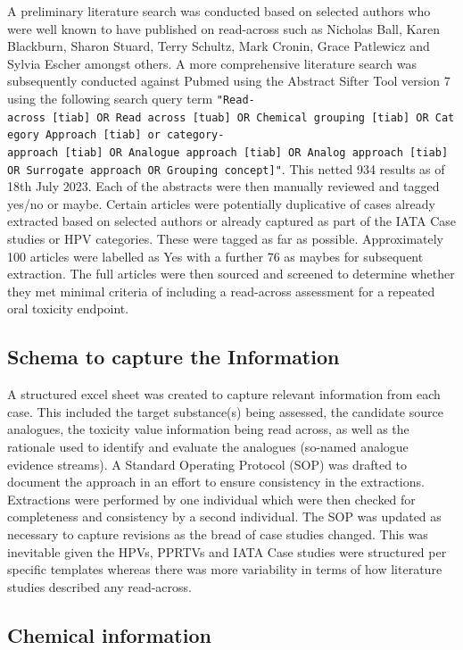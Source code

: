 \documentclass[
  super,
  preprint,
  3p]{elsarticle}
\begin{document}
A preliminary literature search was conducted based on selected authors
who were well known to have published on read-across such as Nicholas
Ball, Karen Blackburn, Sharon Stuard, Terry Schultz, Mark Cronin, Grace
Patlewicz and Sylvia Escher amongst others. A more comprehensive
literature search was subsequently conducted against Pubmed using the
Abstract Sifter Tool version 7 using the following search query term
\texttt{"Read-across\ {[}tiab{]}\ OR\ Read\ across\ {[}tuab{]}\ OR\ Chemical\ grouping\ {[}tiab{]}\ OR\ Category\ Approach\ {[}tiab{]}\ or\ category-approach\ {[}tiab{]}\ OR\ Analogue\ approach\ {[}tiab{]}\ OR\ Analog\ approach\ {[}tiab{]}\ OR\ Surrogate\ approach\ OR\ Grouping\ concept{]}"}.
This netted 934 results as of 18th July 2023. Each of the abstracts were
then manually reviewed and tagged yes/no or maybe. Certain articles were
potentially duplicative of cases already extracted based on selected
authors or already captured as part of the IATA Case studies or HPV
categories. These were tagged as far as possible. Approximately 100
articles were labelled as Yes with a further 76 as maybes for subsequent
extraction. The full articles were then sourced and screened to
determine whether they met minimal criteria of including a read-across
assessment for a repeated oral toxicity endpoint.

\subsection{Schema to capture the
Information}\label{schema-to-capture-the-information}

A structured excel sheet was created to capture relevant information
from each case. This included the target substance(s) being assessed,
the candidate source analogues, the toxicity value information being
read across, as well as the rationale used to identify and evaluate the
analogues (so-named analogue evidence streams). A Standard Operating
Protocol (SOP) was drafted to document the approach in an effort to
ensure consistency in the extractions. Extractions were performed by one
individual which were then checked for completeness and consistency by a
second individual. The SOP was updated as necessary to capture revisions
as the bread of case studies changed. This was inevitable given the
HPVs, PPRTVs and IATA Case studies were structured per specific
templates whereas there was more variability in terms of how literature
studies described any read-across.

\subsection{Chemical information}\label{chemical-information}
\end{document}
